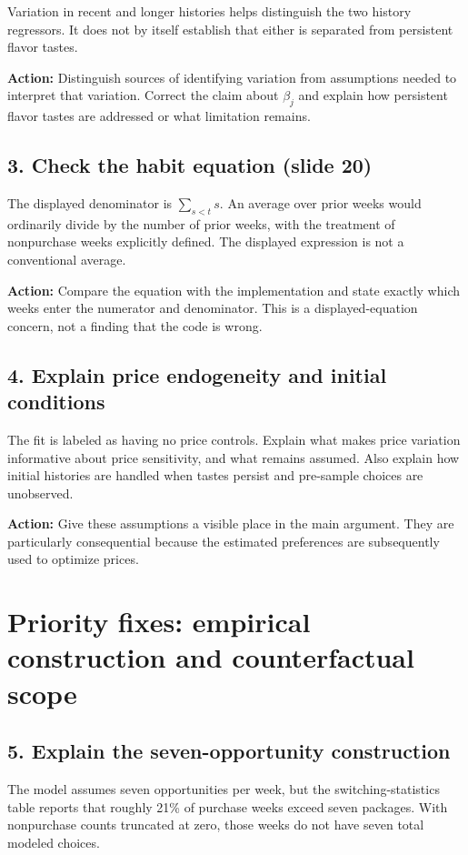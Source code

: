 \documentclass[11pt]{article}
\begin{document}
Variation in recent and longer histories helps distinguish the two history regressors. It does not by itself establish that either is separated from persistent flavor tastes.

\textbf{Action:} Distinguish sources of identifying variation from assumptions needed to interpret that variation. Correct the claim about $\beta_j$ and explain how persistent flavor tastes are addressed or what limitation remains.

\subsection{3. Check the habit equation (slide 20)}
The displayed denominator is $\sum_{s<t}s$. An average over prior weeks would ordinarily divide by the number of prior weeks, with the treatment of nonpurchase weeks explicitly defined. The displayed expression is not a conventional average.

\textbf{Action:} Compare the equation with the implementation and state exactly which weeks enter the numerator and denominator. This is a displayed-equation concern, not a finding that the code is wrong.

\subsection{4. Explain price endogeneity and initial conditions}
The fit is labeled as having no price controls. Explain what makes price variation informative about price sensitivity, and what remains assumed. Also explain how initial histories are handled when tastes persist and pre-sample choices are unobserved.

\textbf{Action:} Give these assumptions a visible place in the main argument. They are particularly consequential because the estimated preferences are subsequently used to optimize prices.

\newpage
\section{Priority fixes: empirical construction and counterfactual scope}

\subsection{5. Explain the seven-opportunity construction}
The model assumes seven opportunities per week, but the switching-statistics table reports that roughly 21\% of purchase weeks exceed seven packages. With nonpurchase counts truncated at zero, those weeks do not have seven total modeled choices.
\end{document}
